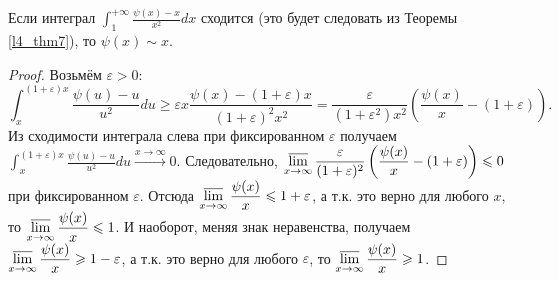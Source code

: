 \begin{lemma} \label{l4_lm12}
	Если интеграл $\displaystyle \int_1^{+\infty} \frac{\psi(x)-x}{x^2}dx$ сходится (это будет следовать из Теоремы \ref{l4_thm7}), то $\psi(x) \sim x$.
\end{lemma}
\begin{proof}
	Возьмём $\varepsilon >0:$
	$$\int_x^{(1+\varepsilon)x}\frac{\psi(u)-u}{u^2}du \geq \varepsilon x \frac{\psi(x)-(1+\varepsilon)x}{(1+\varepsilon)^2x^2} = \frac{\varepsilon}{\left(1+\varepsilon^2\right)x^2}\left(\frac{\psi(x)}{x}-(1+\varepsilon)\right).$$
	Из сходимости интеграла слева при фиксированном $\varepsilon$ получаем $\displaystyle \int_x^{(1+\varepsilon)x}\frac{\psi(u)-u}{u^2}du \xrightarrow{x \to \infty} 0$. Следовательно, $\displaystyle \varlimsup\limits_{x\to\infty} \frac{\varepsilon}{(1+\varepsilon)^2}\left( \frac{\psi(x)}{x}-(1+\varepsilon) \right) \leq 0$ при фиксированном $\varepsilon$. Отсюда $\displaystyle \varlimsup\limits_{x\to\infty} \frac{\psi(x)}{x} \leq 1+\varepsilon$, а т.к. это верно для любого $x$, то $\displaystyle \varlimsup\limits_{x\to\infty} \frac{\psi(x)}{x} \leq 1$. И наоборот, меняя знак неравенства, получаем $\displaystyle \varlimsup\limits_{x\to\infty} \frac{\psi(x)}{x} \geq 1-\varepsilon$, а т.к. это верно для любого $\varepsilon$, то $\displaystyle \varlimsup\limits_{x\to\infty} \frac{\psi(x)}{x} \geq 1$.
\end{proof}

